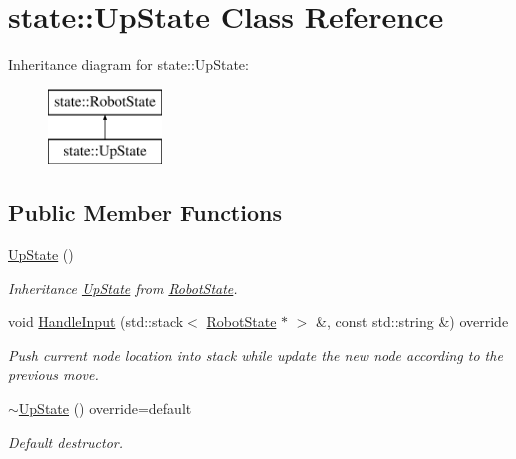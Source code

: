 \hypertarget{classstate_1_1_up_state}{}\section{state\+::Up\+State Class Reference}
\label{classstate_1_1_up_state}
Inheritance diagram for state\+::Up\+State\+:\begin{figure}[H]
\begin{center}
\leavevmode
\includegraphics[height=2.000000cm]{classstate_1_1_up_state}
\end{center}
\end{figure}
\subsection*{Public Member Functions}
\begin{DoxyCompactItemize}
\item 
\mbox{\label{classstate_1_1_up_state_ae6890afc3a3d0a70ebe5b7108609822a}} 
\mbox{\hyperlink{classstate_1_1_up_state_ae6890afc3a3d0a70ebe5b7108609822a}{Up\+State}} ()
\begin{DoxyCompactList}\small\item\em Inheritance \mbox{\hyperlink{classstate_1_1_up_state}{Up\+State}} from \mbox{\hyperlink{classstate_1_1_robot_state}{Robot\+State}}. \end{DoxyCompactList}\item 
\mbox{\label{classstate_1_1_up_state_a746735aca849615d4f34e5e511f28cb3}} 
void \mbox{\hyperlink{classstate_1_1_up_state_a746735aca849615d4f34e5e511f28cb3}{Handle\+Input}} (std\+::stack$<$ \mbox{\hyperlink{classstate_1_1_robot_state}{Robot\+State}} $\ast$ $>$ \&, const std\+::string \&) override
\begin{DoxyCompactList}\small\item\em Push current node location into stack while update the new node according to the previous move. \end{DoxyCompactList}\item 
\mbox{\label{classstate_1_1_up_state_ab48c73f8e6ec6f88286572c0cc4b5e4a}} 
\mbox{\hyperlink{classstate_1_1_up_state_ab48c73f8e6ec6f88286572c0cc4b5e4a}{$\sim$\+Up\+State}} () override=default
\begin{DoxyCompactList}\small\item\em Default destructor. \end{DoxyCompactList}\end{DoxyCompactItemize}


